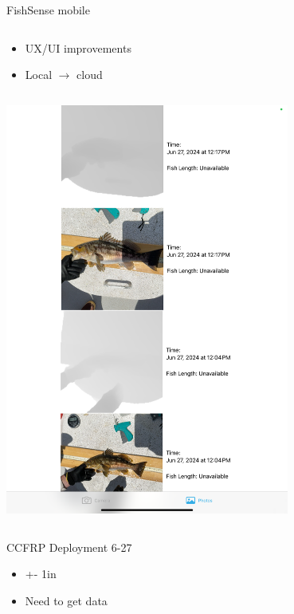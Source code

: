\begin{frame}{FishSense mobile}
    \begin{column}{0.5\textwidth}
    \begin{itemize}
        \item UX/UI improvements
        \item Local $\rightarrow$ cloud
        \end{itemize}
    \end{column}
    \begin{column}{0.5\textwidth}
        \centering
        \includegraphics[height=0.7\textheight,width=0.7\textwidth,keepaspectratio]{images/fs_app.png}
    \end{column}
\end{frame}

\begin{frame}{CCFRP Deployment 6-27}
    \begin{itemize}
        \item +- 1in
        \item Need to get data
    \end{itemize}
\end{frame}


